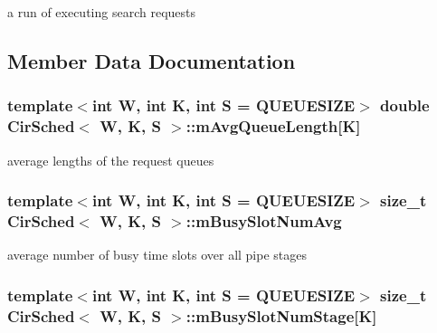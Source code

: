 a run of executing search requests 



\subsection{Member Data Documentation}
\hypertarget{classCirSched_abeeef452afbbfd2449cb7665d4e1a692}{
\subsubsection[{m\-Avg\-Queue\-Length}]{\setlength{\rightskip}{0pt plus 5cm}template$<$int W, int K, int S = Q\-U\-E\-U\-E\-S\-I\-Z\-E$>$ double {\bf Cir\-Sched}$<$ {\bf W}, K, S $>$\-::m\-Avg\-Queue\-Length\mbox{[}K\mbox{]}\hspace{0.3cm}{\ttfamily [private]}}}\label{classCirSched_abeeef452afbbfd2449cb7665d4e1a692}


average lengths of the request queues 

\hypertarget{classCirSched_ac26481f524f6f1e0c01f077fd11fedb7}{
\subsubsection[{m\-Busy\-Slot\-Num\-Avg}]{\setlength{\rightskip}{0pt plus 5cm}template$<$int W, int K, int S = Q\-U\-E\-U\-E\-S\-I\-Z\-E$>$ size\-\_\-t {\bf Cir\-Sched}$<$ {\bf W}, K, S $>$\-::m\-Busy\-Slot\-Num\-Avg\hspace{0.3cm}{\ttfamily [private]}}}\label{classCirSched_ac26481f524f6f1e0c01f077fd11fedb7}


average number of busy time slots over all pipe stages 

\hypertarget{classCirSched_a455f89c9ba1df90426062f1d7be3f768}{
\subsubsection[{m\-Busy\-Slot\-Num\-Stage}]{\setlength{\rightskip}{0pt plus 5cm}template$<$int W, int K, int S = Q\-U\-E\-U\-E\-S\-I\-Z\-E$>$ size\-\_\-t {\bf Cir\-Sched}$<$ {\bf W}, K, S $>$\-::m\-Busy\-Slot\-Num\-Stage\mbox{[}K\mbox{]}\hspace{0.3cm}{\ttfamily [private]}}}\label{classCirSched_a455f89c9ba1df90426062f1d7be3f768}


